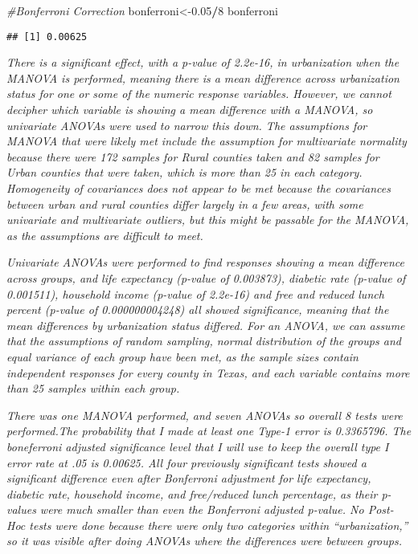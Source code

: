 \documentclass[]{article}
\newenvironment{Shaded}{\begin{snugshade}}{\end{snugshade}}
\newcommand{\CommentTok}[1]{\textcolor[rgb]{0.56,0.35,0.01}{\textit{#1}}}
\newcommand{\DecValTok}[1]{\textcolor[rgb]{0.00,0.00,0.81}{#1}}
\newcommand{\FloatTok}[1]{\textcolor[rgb]{0.00,0.00,0.81}{#1}}
\newcommand{\NormalTok}[1]{#1}
\newcommand{\OperatorTok}[1]{\textcolor[rgb]{0.81,0.36,0.00}{\textbf{#1}}}
\begin{document}
\begin{Shaded}
\begin{Highlighting}[]
\CommentTok{#Bonferroni Correction}
\NormalTok{bonferroni<-}\FloatTok{0.05}\OperatorTok{/}\DecValTok{8}
\NormalTok{bonferroni}
\end{Highlighting}
\end{Shaded}

\begin{verbatim}
## [1] 0.00625
\end{verbatim}

\emph{There is a significant effect, with a p-value of 2.2e-16, in
urbanization when the MANOVA is performed, meaning there is a mean
difference across urbanization status for one or some of the numeric
response variables. However, we cannot decipher which variable is
showing a mean difference with a MANOVA, so univariate ANOVAs were used
to narrow this down. The assumptions for MANOVA that were likely met
include the assumption for multivariate normality because there were 172
samples for Rural counties taken and 82 samples for Urban counties that
were taken, which is more than 25 in each category. Homogeneity of
covariances does not appear to be met because the covariances between
urban and rural counties differ largely in a few areas, with some
univariate and multivariate outliers, but this might be passable for the
MANOVA, as the assumptions are difficult to meet.}

\emph{Univariate ANOVAs were performed to find responses showing a mean
difference across groups, and life expectancy (p-value of 0.003873),
diabetic rate (p-value of 0.001511), household income (p-value of
2.2e-16) and free and reduced lunch percent (p-value of 0.000000004248)
all showed significance, meaning that the mean differences by
urbanization status differed. For an ANOVA, we can assume that the
assumptions of random sampling, normal distribution of the groups and
equal variance of each group have been met, as the sample sizes contain
independent responses for every county in Texas, and each variable
contains more than 25 samples within each group.}

\emph{There was one MANOVA performed, and seven ANOVAs so overall 8
tests were performed.The probability that I made at least one Type-1
error is 0.3365796. The boneferroni adjusted significance level that I
will use to keep the overall type I error rate at .05 is 0.00625. All
four previously significant tests showed a significant difference even
after Bonferroni adjustment for life expectancy, diabetic rate,
household income, and free/reduced lunch percentage, as their p-values
were much smaller than even the Bonferroni adjusted p-value. No Post-Hoc
tests were done because there were only two categories within
``urbanization,'' so it was visible after doing ANOVAs where the
differences were between groups.}
\end{document}
